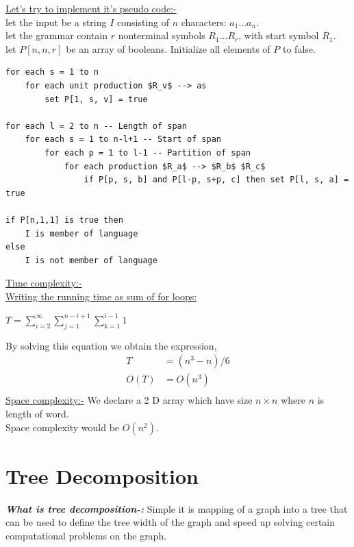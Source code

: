 \documentclass[12pt]{book}
\begin{document}
\underline{Let's try to implement it’s pseudo code:-}\\

let the input be a string $I$ consisting of $n$ characters: $a_1 ... a_n$.\\
let the grammar contain $r$ nonterminal symbols $R_1 ... R_r$, with start symbol $R_1$.\\
let $P[n, n, r]$ be an array of booleans. Initialize all elements of $P$ to false.\\

\begin{lstlisting}[mathescape]
for each s = 1 to n
    for each unit production $R_v$ --> as
        set P[1, s, v] = true

for each l = 2 to n -- Length of span
    for each s = 1 to n-l+1 -- Start of span
        for each p = 1 to l-1 -- Partition of span
            for each production $R_a$ --> $R_b$ $R_c$
                if P[p, s, b] and P[l-p, s+p, c] then set P[l, s, a] = true

if P[n,1,1] is true then
    I is member of language
else
    I is not member of language
\end{lstlisting}
\underline{Time complexity:-}\\

\underline{Writing the running time as sum of for loops:}\\
\begin{center}
\LARGE{$T = \sum\limits_{i = 2}^{\infty} \sum\limits_{j = 1}^{n-i+1} \sum\limits_{k = 1}^{i-1} 1 $}\\
\end{center}
By solving this equation we obtain the expression,
\begin{align*}
T &= (n^3-n)/6\\
O(T) &= O(n^3)\\
\end{align*}
\underline{Space complexity:-}     We declare a 2 D array which have size $n \times n$ where $n$ is length of word.\\
Space complexity would be $O(n^2)$.\\

\chapter{Tree Decomposition}

\textbf{\textit{What is tree decomposition-:}} Simple it is mapping of a graph into a tree that can be used to define the tree width of the graph and speed up solving certain computational problems on the graph.
\end{document}
